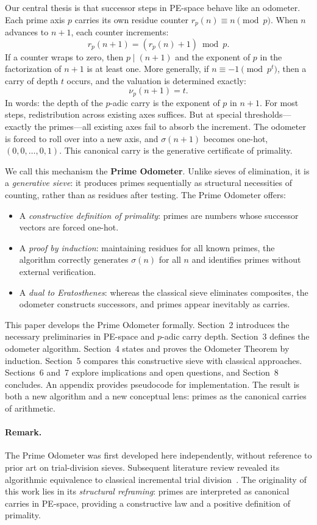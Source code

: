 \documentclass[12pt]{article}
\theoremstyle{definition}
\theoremstyle{remark}
\begin{document}
Our central thesis is that successor steps in PE-space behave like an odometer. Each prime
axis $p$ carries its own residue counter $r_p(n) \equiv n \pmod p$. When $n$ advances to $n+1$,
each counter increments:
\[
r_p(n+1) = (r_p(n)+1) \bmod p.
\]
If a counter wraps to zero, then $p \mid (n+1)$ and the exponent of $p$ in the factorization
of $n+1$ is at least one. More generally, if $n \equiv -1 \pmod{p^t}$, then a carry of depth $t$
occurs, and the valuation is determined exactly:
\[
\nu_p(n+1) = t.
\]
In words: the depth of the $p$-adic carry is the exponent of $p$ in $n+1$. For most steps,
redistribution across existing axes suffices. But at special thresholds---exactly the primes---all
existing axes fail to absorb the increment. The odometer is forced to roll over into a new axis,
and $\sigma(n+1)$ becomes one-hot, $(0,0,\dots,0,1)$. This canonical carry is the generative
certificate of primality.

We call this mechanism the \textbf{Prime Odometer}. Unlike sieves of elimination, it is a
\emph{generative sieve}: it produces primes sequentially as structural necessities of counting,
rather than as residues after testing. The Prime Odometer offers:
\begin{itemize}
    \item A \emph{constructive definition of primality}: primes are numbers whose successor vectors are forced one-hot.
    \item A \emph{proof by induction}: maintaining residues for all known primes, the algorithm correctly generates $\sigma(n)$ for all $n$ and identifies primes without external verification.
    \item A \emph{dual to Eratosthenes}: whereas the classical sieve eliminates composites, the odometer constructs successors, and primes appear inevitably as carries.
\end{itemize}

This paper develops the Prime Odometer formally. Section~2 introduces the necessary preliminaries in
PE-space and $p$-adic carry depth. Section~3 defines the odometer algorithm. Section~4 states and
proves the Odometer Theorem by induction. Section~5 compares this constructive sieve with classical
approaches. Sections~6 and~7 explore implications and open questions, and Section~8 concludes. An
appendix provides pseudocode for implementation. The result is both a new algorithm and a new
conceptual lens: primes as the canonical carries of arithmetic.

\paragraph{Remark.}
The Prime Odometer was first developed here independently, without reference to prior
art on trial-division sieves. Subsequent literature review revealed its algorithmic
equivalence to classical incremental trial division~\cite{hardywright,crandallpomerance}.
The originality of this work lies in its \emph{structural reframing}: primes are interpreted
as canonical carries in PE-space, providing a constructive law and a positive definition
of primality.
\end{document}
